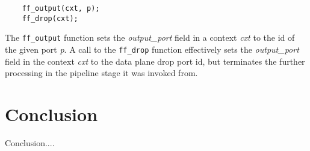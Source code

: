 \begin{lstlisting}
    ff_output(cxt, p);
    ff_drop(cxt);
\end{lstlisting}

The \texttt{ff\_output} function sets the \emph{output\_port} field in a context
\emph{cxt} to the id of the given port \emph{p}. A call to the \texttt{ff\_drop}
function effectively sets the \emph{output\_port} field in the context \emph{cxt}
to the data plane drop port id, but terminates the further processing in the
pipeline stage it was invoked from.

\section{Conclusion}
\label{ff:concl}
Conclusion....
